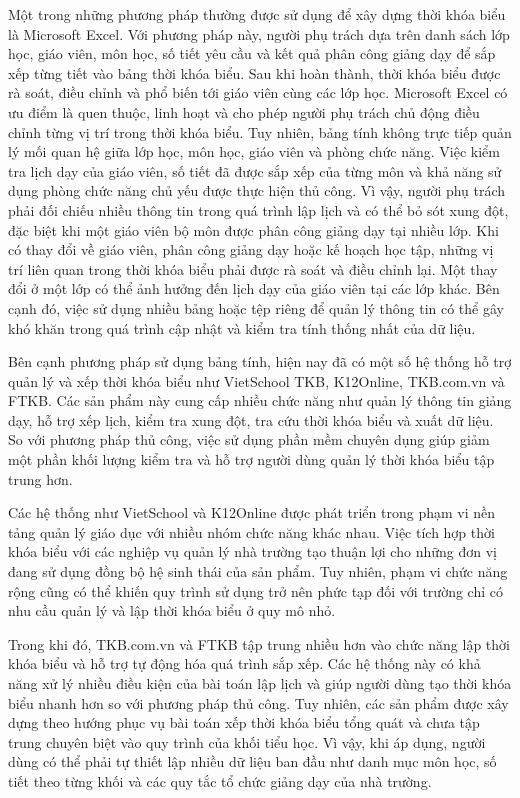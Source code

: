 \documentclass[../DoAn.tex]{subfiles}
\begin{document}
Một trong những phương pháp thường được sử dụng để xây dựng thời khóa biểu là Microsoft Excel. Với phương pháp này, người phụ trách dựa trên danh sách lớp học, giáo viên, môn học, số tiết yêu cầu và kết quả phân công giảng dạy để sắp xếp từng tiết vào bảng thời khóa biểu. Sau khi hoàn thành, thời khóa biểu được rà soát, điều chỉnh và phổ biến tới giáo viên cùng các lớp học. Microsoft Excel có ưu điểm là quen thuộc, linh hoạt và cho phép người phụ trách chủ động điều chỉnh từng vị trí trong thời khóa biểu. Tuy nhiên, bảng tính không trực tiếp quản lý mối quan hệ giữa lớp học, môn học, giáo viên và phòng chức năng. Việc kiểm tra lịch dạy của giáo viên, số tiết đã được sắp xếp của từng môn và khả năng sử dụng phòng chức năng chủ yếu được thực hiện thủ công. Vì vậy, người phụ trách phải đối chiếu nhiều thông tin trong quá trình lập lịch và có thể bỏ sót xung đột, đặc biệt khi một giáo viên bộ môn được phân công giảng dạy tại nhiều lớp. Khi có thay đổi về giáo viên, phân công giảng dạy hoặc kế hoạch học tập, những vị trí liên quan trong thời khóa biểu phải được rà soát và điều chỉnh lại. Một thay đổi ở một lớp có thể ảnh hưởng đến lịch dạy của giáo viên tại các lớp khác. Bên cạnh đó, việc sử dụng nhiều bảng hoặc tệp riêng để quản lý thông tin có thể gây khó khăn trong quá trình cập nhật và kiểm tra tính thống nhất của dữ liệu.

Bên cạnh phương pháp sử dụng bảng tính, hiện nay đã có một số hệ thống hỗ trợ quản lý và xếp thời khóa biểu như VietSchool TKB, K12Online, TKB.com.vn và FTKB. Các sản phẩm này cung cấp nhiều chức năng như quản lý thông tin giảng dạy, hỗ trợ xếp lịch, kiểm tra xung đột, tra cứu thời khóa biểu và xuất dữ liệu. So với phương pháp thủ công, việc sử dụng phần mềm chuyên dụng giúp giảm một phần khối lượng kiểm tra và hỗ trợ người dùng quản lý thời khóa biểu tập trung hơn.

Các hệ thống như VietSchool và K12Online được phát triển trong phạm vi nền tảng quản lý giáo dục với nhiều nhóm chức năng khác nhau. Việc tích hợp thời khóa biểu với các nghiệp vụ quản lý nhà trường tạo thuận lợi cho những đơn vị đang sử dụng đồng bộ hệ sinh thái của sản phẩm. Tuy nhiên, phạm vi chức năng rộng cũng có thể khiến quy trình sử dụng trở nên phức tạp đối với trường chỉ có nhu cầu quản lý và lập thời khóa biểu ở quy mô nhỏ.

Trong khi đó, TKB.com.vn và FTKB tập trung nhiều hơn vào chức năng lập thời khóa biểu và hỗ trợ tự động hóa quá trình sắp xếp. Các hệ thống này có khả năng xử lý nhiều điều kiện của bài toán lập lịch và giúp người dùng tạo thời khóa biểu nhanh hơn so với phương pháp thủ công. Tuy nhiên, các sản phẩm được xây dựng theo hướng phục vụ bài toán xếp thời khóa biểu tổng quát và chưa tập trung chuyên biệt vào quy trình của khối tiểu học. Vì vậy, khi áp dụng, người dùng có thể phải tự thiết lập nhiều dữ liệu ban đầu như danh mục môn học, số tiết theo từng khối và các quy tắc tổ chức giảng dạy của nhà trường.
\end{document}
